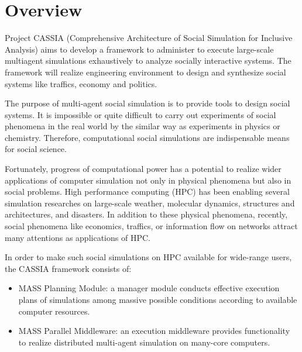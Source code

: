 \section{Overview}
\label{s:Overview}

Project CASSIA (Comprehensive Architecture of Social Simulation for
Inclusive Analysis) aims to develop a framework to administer to
execute large-scale multiagent simulations exhaustively to analyze
socially interactive systems. The framework will realize engineering
environment to design and synthesize social systems like traffics,
economy and politics.

The purpose of multi-agent social simulation is to provide
tools to design social systems.
It is impossible or quite difficult to carry out experiments
of social phenomena in the real world 
by the similar way as experiments in physics or chemistry.
Therefore, computational social simulations are indispensable means
for social science.

Fortunately,
progress of computational power has a potential to realize wider applications of
computer simulation not only in physical phenomena but also in social 
problems.
High performance computing (HPC) has been enabling several simulation researches
on large-scale weather, molecular dynamics, structures and architectures, and
disasters.
In addition to these physical phenomena,
recently,
social phenomena like economics, traffics, or information flow on
networks
attract many attentions as applications of HPC.

In order to make such social simulations on HPC
available for wide-range users,
the CASSIA framework consists of:
\begin{itemize}
  \item
    MASS Planning Module: a manager module conducts effective
    execution plans of simulations among massive possible conditions
    according to available computer resources.
  \item
    MASS Parallel Middleware: an execution middleware provides
    functionality to realize distributed multi-agent simulation on
    many-core computers.
\end{itemize}

